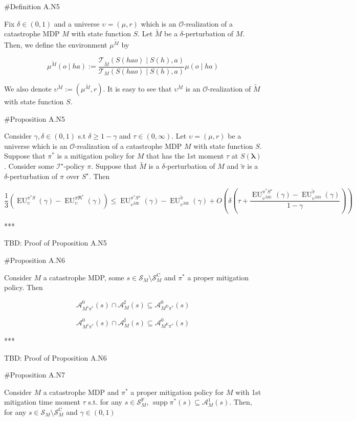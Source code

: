 \documentclass[a4paper]{article}
\DeclareMathOperator{\Supp}{supp}
\newcommand{\AP}[1]{\left(#1\right)}
\newcommand{\Estr}{\boldsymbol{\lambda}}
\newcommand{\Ob}{\mathcal{O}}
\newcommand{\A}{\mathcal{A}}
\newcommand{\St}{\mathcal{S}}
\newcommand{\T}{\mathcal{T}}
\newcommand{\In}{\mathcal{I}}
\newcommand{\RMC}{\mathrm{C}}
\newcommand{\RMD}{\mathrm{D}}
\newcommand{\RME}{\mathrm{E}}
\newcommand{\RMF}{\mathrm{F}}
\newcommand{\SF}{\St^{\RMF}}
\newcommand{\SC}{\St^{\RMC}}
\newcommand{\MD}{M^{\RMD}}
\newcommand{\ME}{M^{\RME}}
\newcommand{\EU}{\operatorname{EU}}
\begin{document}
\#Definition A.N5

Fix $\delta\in(0,1)$ and a universe $\upsilon=(\mu,r)$ which is an $\Ob$-realization of a catastrophe MDP $M$ with state function $S$. Let $\tilde{M}$ be a $\delta$-perturbation of $M$. Then, we define the environment $\mu^{\tilde{M}}$ by

$$\mu^{\tilde{M}}(o \mid ha) := \frac{\T_{\tilde{M}}\AP{S(hao) \mid S(h),a}}{\T_{M}\AP{S(hao) \mid S(h),a}}\mu(o \mid ha)$$

We also denote $\upsilon^{\tilde{M}}:=\AP{\mu^{\tilde{M}},r}$. It is easy to see that $\upsilon^{\tilde{M}}$ is an $\Ob$-realization of $\tilde{M}$ with state function $S$.

\#Proposition A.N5

Consider $\gamma,\delta\in(0,1)$ s.t $\delta \geq 1 - \gamma$ and $\tau\in(0,\infty)$. Let $\upsilon=(\mu,r)$ be a universe which is an $\Ob$-realization of a catastrophe MDP $M$ with state function $S$. Suppose that $\pi^*$ is a mitigation policy for $M$ that has the 1st moment $\tau$ at $S(\Estr)$. Consider some $\In^\star$-policy $\pi$. Suppose that $\tilde{M}$ is a $\delta$-perturbation of $M$ and $\tilde{\pi}$ is a $\delta$-perturbation of $\pi$ over $S^\star$. Then

$$\frac{1}{3}\AP{\EU_{\upsilon}^{\pi^* S}(\gamma)-\EU_{\upsilon}^{\pi\Re^*}(\gamma)} \leq \EU_{\upsilon^{\tilde{M}\RME}}^{\pi^* S^\star}(\gamma)-\EU_{\upsilon^{\tilde{M}\RME}}^{\tilde{\pi}}(\gamma)   + O\AP{\delta\AP{\tau+\frac{\EU_{\upsilon^{\tilde{M}\RMD}}^{\pi^* S^\star}(\gamma)-\EU_{\upsilon^{\tilde{M}\RMD}}^{\tilde{\pi}}(\gamma)}{1-\gamma}}}$$

***

TBD: Proof of Proposition A.N5

\#Proposition A.N6

Consider $M$ a catastrophe MDP, some $s \in \St_M \setminus \SC_M$ and $\pi^*$ a proper mitigation policy. Then

$$\A_{M^\flat\pi^*}^0\AP{s} \cap \A_M^\sharp(s) \subseteq \A_{\MD\pi^*}^0\AP{s}$$

$$\A_{M^\flat\pi^*}^0\AP{s} \cap \A_M^\sharp(s) \subseteq \A_{\ME\pi^*}^0\AP{s}$$

***

TBD: Proof of Proposition A.N6

\#Proposition A.N7

Consider $M$ a catastrophe MDP and $\pi^*$ a proper mitigation policy for $M$ with 1st mitigation time moment $\tau$ s.t. for any $s\in\SF_M$, $\Supp{\pi^*(s)} \subseteq \A_M^1(s)$. Then, for any $s \in \St_M \setminus \SC_M$ and $\gamma\in(0,1)$
\end{document}
